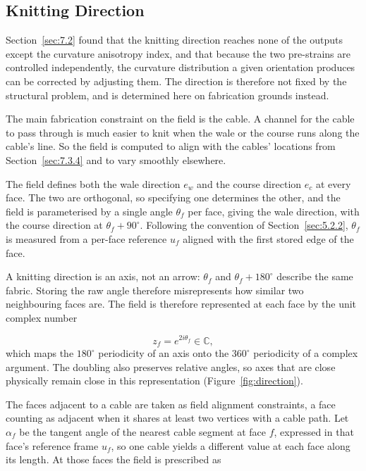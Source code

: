 \FloatBarrier
\subsection{Knitting Direction}\label{sec:7.3.5}

Section~\ref{sec:7.2} found that the knitting direction reaches none of the outputs except the curvature anisotropy index, and that because the two pre-strains are controlled independently, the curvature distribution a given orientation produces can be corrected by adjusting them. The direction is therefore not fixed by the structural problem, and is determined here on fabrication grounds instead.

The main fabrication constraint on the field is the cable. A channel for the cable to pass through is much easier to knit when the wale or the course runs along the cable's line. So the field is computed to align with the cables' locations from Section~\ref{sec:7.3.4} and to vary smoothly elsewhere.

The field defines both the wale direction \(e_{w}\) and the course direction \(e_{c}\) at every face. The two are orthogonal, so specifying one determines the other, and the field is parameterised by a single angle \(\theta_{f}\) per face, giving the wale direction, with the course direction at \(\theta_{f} + 90^{\circ}\). Following the convention of Section~\ref{sec:5.2.2}, \(\theta_{f}\) is measured from a per-face reference \(u_{f}\) aligned with the first stored edge of the face.

A knitting direction is an axis, not an arrow: \(\theta_{f}\) and \(\theta_{f} + 180^{\circ}\) describe the same fabric. Storing the raw angle therefore misrepresents how similar two neighbouring faces are. The field is therefore represented at each face by the unit complex number

\begin{equation}\label{eq:7:17}
  z_{f} = e^{2i\theta_{f}} \in \mathbb{C},
\end{equation}
which maps the \(180^{\circ}\) periodicity of an axis onto the \(360^{\circ}\) periodicity of a complex argument. The doubling also preserves relative angles, so axes that are close physically remain close in this representation (Figure~\ref{fig:direction}).

The faces adjacent to a cable are taken as field alignment constraints, a face counting as adjacent when it shares at least two vertices with a cable path. Let \(\alpha_{f}\) be the tangent angle of the nearest cable segment at face \(f\), expressed in that face's reference frame \(u_{f}\), so one cable yields a different value at each face along its length. At those faces the field is prescribed as

